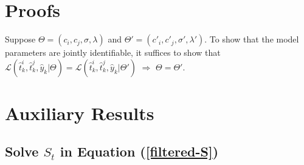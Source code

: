 \documentclass[mnsc]{informs3}
\begin{document}
\newpage
\begin{APPENDICES}


\section{Proofs}

Suppose $\Theta = (c_i, c_j, \sigma, \lambda)$ and $\Theta' = (c'_i, c'_j, \sigma', \lambda')$. 
To show that the model parameters are jointly identifiable, it suffices to show that $\mathcal{L}(\hat{t}^i_k, \hat{t}^j_k, \hat{y}_k | \Theta) = \mathcal{L}(\hat{t}^i_k, \hat{t}^j_k, \hat{y}_k | \Theta')$ $\Rightarrow$ $\Theta = \Theta'$. 
\Halmos
\endproof






\section{Auxiliary Results}

\subsection{Solve $S_t$ in Equation (\ref{filtered-S})}\label{app-S-equ}


\end{APPENDICES}
\end{document}
